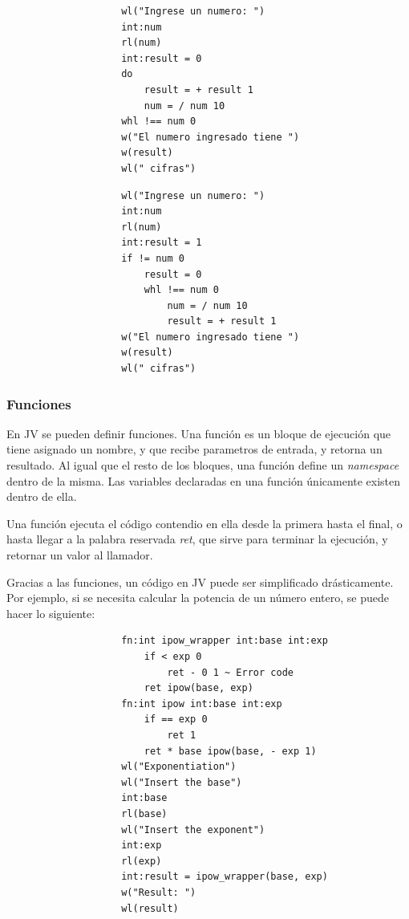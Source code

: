 \documentclass{article}
\begin{document}
                \begin{lstlisting}
                    wl("Ingrese un numero: ")
                    int:num
                    rl(num)
                    int:result = 0
                    do
                        result = + result 1
                        num = / num 10
                    whl !== num 0
                    w("El numero ingresado tiene ")
                    w(result)
                    wl(" cifras")
                \end{lstlisting}
                \begin{lstlisting}
                    wl("Ingrese un numero: ")
                    int:num
                    rl(num)
                    int:result = 1
                    if != num 0
                        result = 0
                        whl !== num 0
                            num = / num 10
                            result = + result 1
                    w("El numero ingresado tiene ")
                    w(result)
                    wl(" cifras")
                \end{lstlisting}

            \subsubsection{Funciones}
                \par En JV se pueden definir funciones. Una función es un bloque de ejecución que tiene asignado un nombre, y que recibe parametros de entrada, y retorna un resultado. Al igual que el resto de los bloques, una función define un \textit{namespace} dentro de la misma. Las variables declaradas en una función únicamente existen dentro de ella.
                \par Una función ejecuta el código contendio en ella desde la primera hasta el final, o hasta llegar a la palabra reservada \textit{ret}, que sirve para terminar la ejecución, y retornar un valor al llamador.
                \par Gracias a las funciones, un código en JV puede ser simplificado drásticamente. Por ejemplo, si se necesita calcular la potencia de un número entero, se puede hacer lo siguiente:
                \begin{lstlisting}
                    fn:int ipow_wrapper int:base int:exp
                    	if < exp 0
                    		ret - 0 1 ~ Error code
                    	ret ipow(base, exp)
                    fn:int ipow int:base int:exp
                    	if == exp 0
                    		ret 1
                    	ret * base ipow(base, - exp 1)
                    wl("Exponentiation")
                    wl("Insert the base")
                    int:base
                    rl(base)
                    wl("Insert the exponent")
                    int:exp
                    rl(exp)
                    int:result = ipow_wrapper(base, exp)
                    w("Result: ")
                    wl(result)
                \end{lstlisting}
\end{document}
